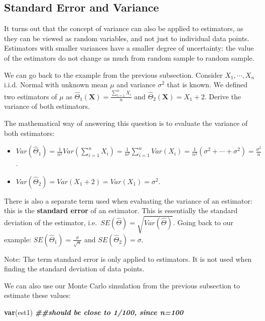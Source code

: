 \documentclass[
]{book}
\newenvironment{Shaded}{\begin{snugshade}}{\end{snugshade}}
\newcommand{\DocumentationTok}[1]{\textcolor[rgb]{0.56,0.35,0.01}{\textbf{\textit{#1}}}}
\newcommand{\FunctionTok}[1]{\textcolor[rgb]{0.13,0.29,0.53}{\textbf{#1}}}
\newcommand{\NormalTok}[1]{#1}
\begin{document}
\hypertarget{standard-error-and-variance}{%
\subsection{Standard Error and Variance}\label{standard-error-and-variance}}

It turns out that the concept of variance can also be applied to estimators, as they can be viewed as random variables, and not just to individual data points. Estimators with smaller variances have a smaller degree of uncertainty: the value of the estimators do not change as much from random sample to random sample.

We can go back to the example from the previous subsection. Consider \(X_1, \cdots, X_n\) i.i.d. Normal with unknown mean \(\mu\) and variance \(\sigma^2\) that is known. We defined two estimators of \(\mu\) as \(\hat{\Theta}_1(\boldsymbol{X}) = \frac{\sum_{i=1}^n X_i}{n}\) and \(\hat{\Theta}_2(\boldsymbol{X}) = X_1 + 2\). Derive the variance of both estimators.

The mathematical way of answering this question is to evaluate the variance of both estimators:

\begin{itemize}
\item
  \(Var(\hat{\Theta}_1) = \frac{1}{n^2}Var(\sum_{i=1}^n X_i) = \frac{1}{n^2} \sum_{i=1}^n Var(X_i) = \frac{1}{n^2} (\sigma^2 + \cdots + \sigma^2) = \frac{\sigma^2}{n}\).
\item
  \(Var(\hat{\Theta}_2) = Var(X_1 + 2) = Var(X_1) = \sigma^2\).
\end{itemize}

There is also a separate term used when evaluating the variance of an estimator: this is the \textbf{standard error} of an estimator. This is essentially the standard deviation of the estimator, i.e.~\(SE(\hat{\Theta}) = \sqrt{Var(\hat{\Theta})}\). Going back to our example: \(SE(\hat{\Theta}_1) = \frac{\sigma}{\sqrt{n}}\) and \(SE(\hat{\Theta}_2) = \sigma\).

Note: The term standard error is only applied to estimators. It is not used when finding the standard deviation of data points.

We can also use our Monte Carlo simulation from the previous subsection to estimate these values:

\begin{Shaded}
\begin{Highlighting}[]
\FunctionTok{var}\NormalTok{(est1) }\DocumentationTok{\#\#should be close to 1/100, since n=100}
\end{Highlighting}
\end{Shaded}
\end{document}
